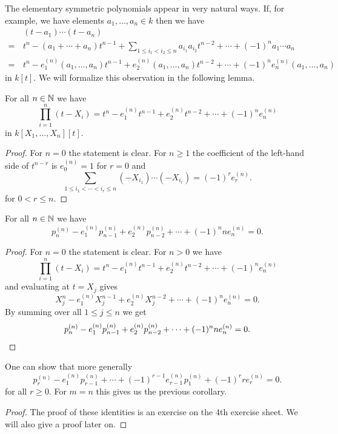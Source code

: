 The elementary symmetric polynomials appear in very natural ways.
If, for example, we have elements $a_1, \dotsc, a_n \in k$ then we have
\begin{align*}
   &\, (t-a_1) \dotsm (t-a_n) \\
  =&\, t^n - (a_1 + \dotsb + a_n) t^{n-1} + \sum_{1 \leq i_1 < i_2 \leq n} a_{i_1} a_{i_2} t^{n-2} + \dotsb + (-1)^n a_1 \dotsm a_n \\ 
  =&\, t^n - e^{(n)}_1(a_1, \dotsc, a_n) t^{n-1} + e^{(n)}_2(a_1, \dotsc, a_n) t^{n-2} + \dotsb + (-1)^n e^{(n)}_n(a_1, \dotsc, a_n)
\end{align*}
in $k[t]$.
We will formalize this observation in the following lemma.


\begin{lem}
  For all $n \in \mathbb{N}$ we have
  \[
      \prod_{i=1}^n (t-X_i)
    = t^n - e^{(n)}_1 t^{n-1} + e^{(n)}_2 t^{n-2} + \dotsb + (-1)^n e^{(n)}_n
  \]
  in $k[X_1, \dotsc, X_n][t]$.
\end{lem}
\begin{proof}
  For $n = 0$ the statement is clear.
  For $n \geq 1$ the coefficient of the left-hand side of $t^{n-r}$ is $e^{(n)}_0 = 1$ for $r = 0$ and
  \[
      \sum_{1 \leq i_1 < \dotsb < i_r \leq n} (-X_{i_1}) \dotsm (-X_{i_r})
    = (-1)^r e^{(n)}_r.
  \]
  for $0 < r \leq n$.
\end{proof}


\begin{cor}
  For all $n \in \mathbb{N}$ we have
  \[
      p^{(n)}_n - e^{(n)}_1 p^{(n)}_{n-1} + e^{(n)}_2 p^{(n)}_{n-2} + \dotsb + (-1)^n n e^{(n)}_n
    = 0.
  \]
\end{cor}
\begin{proof}
  For $n = 0$ the statement is clear. For $n > 0$ we have
  \[
      \prod_{i=1}^n (t-X_i)
    = t^n - e^{(n)}_1 t^{n-1} + e^{(n)}_2 t^{n-2} + \dotsb + (-1)^n e^{(n)}_n
  \]
  and evaluating at $t = X_j$ gives
  \[
      X_j^n - e^{(n)}_1 X_j^{n-1} + e^{(n)}_2 X_j^{n-2} + \dotsb + (-1)^n e^{(n)}_n
    = 0.
  \]
  By summing over all $1 \leq j \leq n$ we get
  \[
      p^{(n)}_n - e^{(n)}_1 p^{(n)}_{n-1} + e^{(n)}_2 p^{(n)}_{n-2} + \dotsb + (-1)^n n e^{(n)}_n
    = 0.
    \qedhere
  \]
\end{proof}


\begin{rem}
  One can show that more generally
  \[
      p^{(n)}_r - e^{(n)}_1 p^{(n)}_{r-1} + \dotsb + (-1)^{r-1} e^{(n)}_{r-1} p^{(n)}_1 + (-1)^r r e^{(n)}_r
    = 0.
  \]
  for all $r \geq 0$.
  For $m = n$ this gives us the previous corollary.
\end{rem}
\begin{proof}
  The proof of these identities is an exercise on the 4th exercise sheet.
  We will also give a proof later on.
\end{proof}


